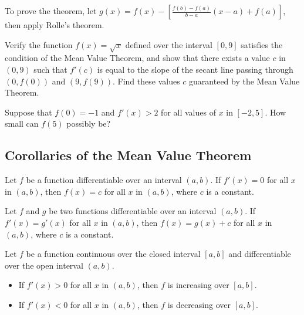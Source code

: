 To prove the theorem, let
\(g(x)=f(x) - [\frac{f(b) - f(a)}{b - a}(x - a)+f(a)]\), then apply Rolle's
theorem.

\begin{example}

Verify the function \(f(x)=\sqrt{x}\) defined over the interval
\([0,9]\) satisfies the condition of the Mean Value Theorem, and show
that there exists a value \(c\) in \((0,9)\) such that \(f'(c)\) is
equal to the slope of the secant line passing through \((0,f(0))\) and
\((9,f(9))\). Find these values \(c\) guaranteed by the Mean Value
Theorem.

\end{example}
\vspace*{6\baselineskip}

\begin{example}

Suppose that \(f(0)=-1\) and \(f'(x)>2\) for all values of \(x\) in
\([-2, 5]\). How small can \(f(5)\) possibly be?

\end{example}
\vspace*{6\baselineskip}

\hypertarget{corollaries-of-the-mean-value-theorem}{%
\subsection{Corollaries of the Mean Value
Theorem}\label{corollaries-of-the-mean-value-theorem}}

\begin{corollary}

Let \(f\) be a function differentiable over an interval \((a, b)\). If
\(f'(x)=0\) for all \(x\) in \((a, b)\), then \(f(x)=c\) for all \(x\)
in \((a, b)\), where \(c\) is a constant.

\end{corollary}

\begin{corollary}

Let \(f\) and \(g\) be two functions differentiable over an interval
\((a, b)\). If \(f'(x)=g'(x)\) for all \(x\) in \((a, b)\), then
\(f(x)=g(x)+c\) for all \(x\) in \((a, b)\), where \(c\) is a constant.

\end{corollary}

\begin{corollary}

Let \(f\) be a function continuous over the closed interval \([a,b]\)
and differentiable over the open interval \((a,b)\).

\begin{itemize}
\item
  If \(f'(x)>0\) for all \(x\) in \((a, b)\), then \(f\) is increasing
  over \([a, b]\).
\item
  If \(f'(x)<0\) for all \(x\) in \((a, b)\), then \(f\) is decreasing
  over \([a, b]\).
\end{itemize}

\end{corollary}

